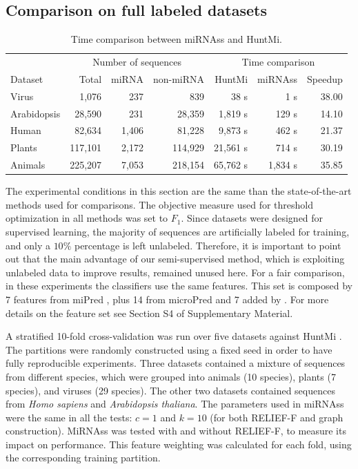 \documentclass{article}
\begin{document}
\subsection{Comparison on full labeled datasets}
\begin{table}[tpb]
	\centering
	\caption{Time comparison between miRNAss and HuntMi.\label{tab:times}}
	\begin{tabular}{@{}lrrrrrr@{}} \toprule
		&  \multicolumn{3}{c}{Number of sequences} & \multicolumn{3}{c}{Time comparison} \\
		Dataset     &   Total  &   miRNA   &  non-miRNA  &  HuntMi  & miRNAss & Speedup  \\\midrule
		Virus       &   1,076  &      237  &       839   &     38 s &     1 s & 38.00    \\
		Arabidopsis &  28,590  &      231  &    28,359   &  1,819 s &   129 s & 14.10    \\
		Human       &  82,634  &    1,406  &    81,228   &  9,873 s &   462 s & 21.37    \\
		Plants      & 117,101  &    2,172  &   114,929   & 21,561 s &   714 s & 30.19    \\
		Animals     & 225,207  &    7,053  &   218,154   & 65,762 s & 1,834 s & 35.85    \\\bottomrule
	\end{tabular}
\end{table}
The experimental conditions in this section are the same than the state-of-the-art methods used for comparisons. The objective measure used for threshold optimization in all methods was set to $F_{1}$. Since datasets were designed for supervised learning, the majority of sequences are artificially labeled for training, and only a $10 \%$ percentage is left unlabeled. Therefore, it is important to point out that the main advantage of our semi-supervised method, which is exploiting unlabeled data to improve results, remained unused here.
For a fair comparison, in these experiments the classifiers use the same features. This set is composed by 7 features from miPred \citep{ng2007novo}, plus 14 from microPred \citep{batuwita2009micropred} and 7 added by \cite{gudys2013huntmi}. For more details on the feature set see Section S4 of Supplementary Material.

A stratified 10-fold cross-validation was run over five datasets against HuntMi \citep{gudys2013huntmi}. The partitions were randomly constructed using a fixed seed in order to have fully reproducible experiments. Three datasets contained a mixture of sequences from different species, which were grouped into animals (10 species), plants (7 species), and viruses (29 species). The other two datasets contained sequences from \textit{Homo sapiens} and \textit{Arabidopsis thaliana}. The parameters used in miRNAss were the same in all the tests: $c=1$ and $k=10$ (for both RELIEF-F and graph construction). MiRNAss was tested with and without RELIEF-F, to measure its impact on  performance. This feature weighting was calculated for each fold, using the corresponding training partition.
\end{document}
